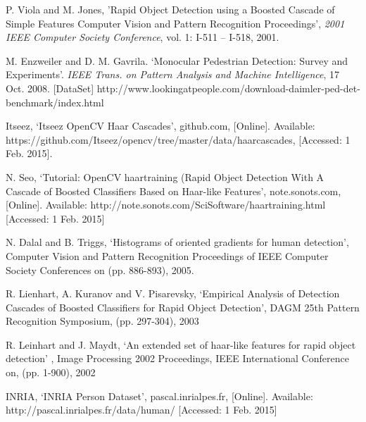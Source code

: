 \documentclass[12pt, onecolumn, conference]{IEEEtran}
\begin{document}
\begin{thebibliography}{1}
P. Viola and M. Jones, 'Rapid Object Detection using a Boosted Cascade of Simple Features Computer Vision and Pattern Recognition Proceedings', \textit{2001 IEEE Computer Society Conference}, vol. 1: I-511 – I-518, 2001.

M. Enzweiler and D. M. Gavrila. ‘Monocular Pedestrian Detection: Survey and Experiments’. \textit{IEEE Trans. on Pattern Analysis and Machine Intelligence}, 17 Oct. 2008. [DataSet] http://www.lookingatpeople.com/download-daimler-ped-det-benchmark/index.html

Itseez, ‘Itseez OpenCV Haar Cascades’, github.com, [Online].  Available: https://github.com/Itseez/opencv/tree/master/data/haarcascades, [Accessed: 1 Feb. 2015].

N. Seo, ‘Tutorial: OpenCV haartraining (Rapid Object Detection With A Cascade of Boosted Classifiers Based on Haar-like Features’,  note.sonots.com, [Online]. Available:
http://note.sonots.com/SciSoftware/haartraining.html [Accessed: 1 Feb. 2015]

N. Dalal and B. Triggs, ‘Histograms of oriented gradients for human detection’, Computer Vision and Pattern Recognition Proceedings of  IEEE Computer Society Conferences on (pp. 886-893), 2005.

R. Lienhart, A. Kuranov and V. Pisarevsky, ‘Empirical Analysis of Detection Cascades of Boosted Classifiers for Rapid Object Detection’, DAGM 25th Pattern Recognition Symposium, (pp. 297-304), 2003

R. Leinhart and J. Maydt, ‘An extended set of haar-like features for rapid object detection’ ,  Image Processing 2002 Proceedings,  IEEE International Conference on, (pp. 1-900), 2002

INRIA, ‘INRIA Person Dataset’, pascal.inrialpes.fr, [Online]. Available: http://pascal.inrialpes.fr/data/human/ [Accessed: 1 Feb. 2015]

\end{thebibliography}
 
\end{document}
